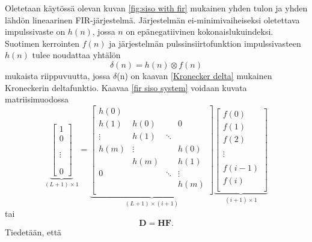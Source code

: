 \documentclass[finnish,12pt]{article}
\begin{document}
Oletetaan käytössä olevan kuvan \ref{fig:siso with fir} mukainen yhden tulon ja yhden lähdön lineaarinen FIR-järjestelmä. Järjestelmän ei-minimivaiheiseksi oletettava impulssivaste on $h(n)$, jossa $n$ on epänegatiivinen kokonaislukuindeksi. Suotimen kerrointen $f(n)$ ja järjestelmän pulssinsiirtofunktion impulssivasteen $h(n)$ tulee noudattaa yhtälön \begin{equation}
\label{fir siso system}
\delta(n) = h(n) \otimes f(n)
\end{equation} mukaista riippuvuutta, jossa $\delta$(n) on kaavan \eqref{Kronecker delta} mukainen Kroneckerin deltafunktio. Kaavaa \eqref{fir siso system} voidaan kuvata matriisimuodossa \begin{equation}
\underbrace{\begin{bmatrix}
\label{matrixDGH}
1 \\
0 \\
 \\
 \\
\vdots \\
 \\
 \\
0
\end{bmatrix}}_{(L+1) \times 1} = \underbrace{\begin{bmatrix}
h(0) \\
h(1) & h(0) & & 0 \\
\vdots & h(1) & \ddots \\ 
h(m) & \vdots & & h(0) \\
 & h(m) & & h(1) \\
 0 & & \ddots & \vdots \\
& & & h(m) \\
\end{bmatrix}}_{(L+1) \times (i+1)} \underbrace{\begin{bmatrix}
f(0) \\
f(1) \\
f(2) \\
 \\
\vdots \\
 \\
f(i-1) \\
f(i) \\
\end{bmatrix}}_{(i+1) \times 1}
\end{equation} tai \begin{equation}
\label{plainDGH}
\textbf{D} = \textbf{HF}.
\end{equation} Tiedetään, että \begin{equation}

\end{equation}
\end{document}
